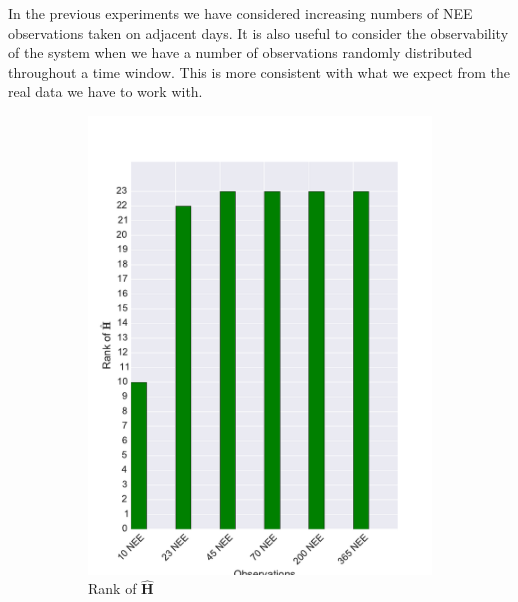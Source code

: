 \documentclass[11pt]{article}
\begin{document}
In the previous experiments we have considered increasing numbers of NEE observations taken on adjacent days. It is also useful to consider the observability of the system when we have a number of observations randomly distributed throughout a time window. This is more consistent with what we expect from the real data we have to work with.  

\begin{figure}[ht]
    \centering
    \begin{subfigure}[b]{0.49\textwidth}
        \includegraphics[width=\textwidth]{dalec2_obsrankwind.pdf}
        \caption{Rank of $\hat{\textbf{H}}$}
        \label{fig:D2_observailityrankwind}
    \end{subfigure}
    \begin{subfigure}[b]{0.49\textwidth}

\end{subfigure}
\end{figure}
\end{document}
